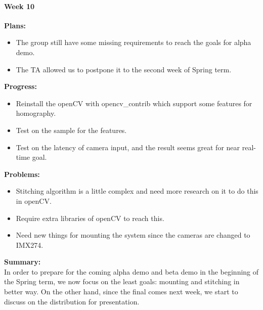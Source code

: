 \paragraph{Week 10}
\begin{adjustwidth}{2.5em}{0pt}
    \vspace{-0.5cm}\textbf{Plans:}
    \vspace{-0.5cm}
    \begin{itemize}
        \item The group still have some missing requirements to reach the goals for alpha demo.
        \item The TA allowed us to postpone it to the second week of Spring term.
    \end{itemize} 
    \vspace{-0.3cm}\textbf{Progress:}
    \vspace{-0.5cm}
    \begin{itemize}
        \item Reinstall the openCV with opencv_contrib which support some features for homography.
        \item Test on the sample for the features.
        \item Test on the latency of camera input, and the result seems great for near real-time goal.
    \end{itemize} 
    \vspace{-0.3cm}\textbf{Problems:}
    \vspace{-0.5cm}
    \begin{itemize}
        \item Stitching algorithm is a little complex and need more research on it to do this in openCV.
        \item Require extra libraries of openCV to reach this.
        \item Need new things for mounting the system since the cameras are changed to IMX274.
    \end{itemize}  
    \vspace{-0.3cm}\noindent\textbf{Summary:}\\
    \noindent In order to prepare for the coming alpha demo and beta demo in the beginning of the Spring term,
     we now focus on the least goals: mounting and stitching in better way. On the other hand, since the final 
     comes next week, we start to discuss on the distribution for presentation. \\
\end{adjustwidth}

